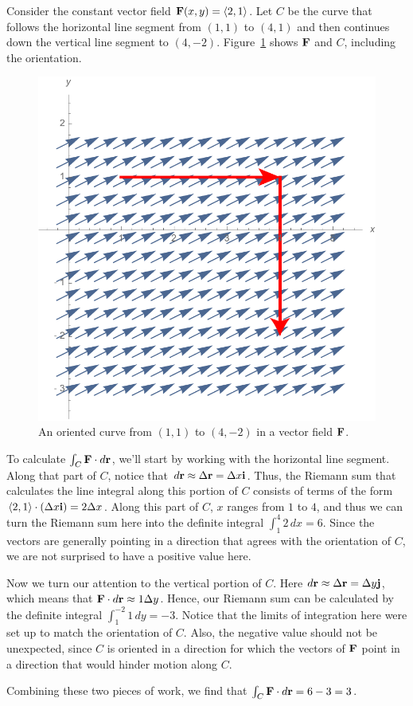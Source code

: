 \begin{example}\label{ex:12.2.line-int}
  Consider the constant vector field $\mathbf{F}(x,y) = \langle
  2,1\rangle$. Let $C$ be the curve that follows the horizontal line
  segment from $(1,1)$ to $(4,1)$ and then continues down the vertical
  line segment to $(4,-2)$. Figure~\ref{fig:12.2.curve-field} shows
  $\mathbf{F}$ and $C$, including the orientation.

\begin{figure}[h]
  \centering
  \includegraphics[width=0.45\linewidth]{figures/fig_12_2_field_line_segs.pdf}
  \caption{An oriented curve from $(1,1)$ to $(4,-2)$ in a vector
    field $\mathbf{F}$.}
  \label{fig:12.2.curve-field}
\end{figure}

To calculate $\int_C\mathbf{F}\cdot d\mathbf{r}$, we'll start by working with the
horizontal line segment. Along that part of $C$, notice that
$d\mathbf{r}\approx \Delta\mathbf{r} = \Delta x\mathbf{i}$. Thus, the Riemann sum that
calculates the line integral along this portion of $C$ consists of
terms of the form $\langle 2,1\rangle\cdot (\Delta x \mathbf{i}) = 2\Delta
x$. Along this part of $C$, $x$ ranges from $1$ to $4$, and thus we
can turn the Riemann sum here into the definite integral $\int_1^4 2\,
dx = 6$. Since the vectors are generally pointing in a direction that
agrees with the orientation of $C$, we are not surprised to have a
positive value here.

Now we turn our attention to the vertical portion of $C$. Here $d\mathbf{r}
\approx \Delta\mathbf{r} = \Delta y\mathbf{j}$, which means that $\mathbf{F}\cdot
d\mathbf{r}\approx 1\Delta y$. Hence, our Riemann sum can
be calculated by the definite integral $\int_1^{-2} 1\, dy =
-3$. Notice that the limits of integration here were set up to match
the orientation of $C$. Also, the negative value should not be
unexpected, since $C$ is oriented in a direction for which the vectors
of $\mathbf{F}$ point in a direction that would hinder motion along $C$.

Combining these two pieces of work, we find that $\int_C \mathbf{F}\cdot d\mathbf{r}
= 6 - 3 = 3$.
\end{example}

